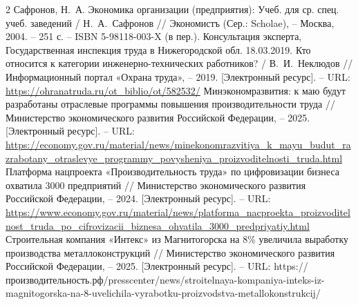 \documentclass{article}
\begin{document}
\begin{thebibliography}{2}
 Сафронов, Н.~А. Экономика организации (предприятия): Учеб. для ср. спец. учеб. заведений / Н.~А.~Сафронов // Экономистъ (Сер.: Scholae), – Москва, 2004. – 251 с. – ISBN 5-98118-003-X (в пер.).
 Консультация эксперта, Государственная инспекция труда в Нижегородской обл. 18.03.2019. Кто относится к категории инженерно-технических работников? / В.~И.~Неклюдов // Информационный портал «Охрана труда», – 2019. [Электронный ресурс]. – URL: \url{https://ohranatruda.ru/ot_biblio/ot/582532/}
 Минэкономразвития: к маю будут разработаны отраслевые программы повышения производительности труда // Министерство экономического развития Российской Федерации, – 2025. [Электронный ресурс]. – URL: \url{https://economy.gov.ru/material/news/minekonomrazvitiya_k_mayu_budut_razrabotany_otraslevye_programmy_povysheniya_proizvoditelnosti_truda.html}
 Платформа нацпроекта «Производительность труда» по цифровизации бизнеса охватила 3000 предприятий // Министерство экономического развития Российской Федерации, – 2024. [Электронный ресурс]. – URL: \url{https://www.economy.gov.ru/material/news/platforma_nacproekta_proizvoditelnost_truda_po_cifrovizacii_biznesa_ohvatila_3000_predpriyatiy.html}
 Строительная компания «Интекс» из Магнитогорска на 8\% увеличила выработку производства металлоконструкций // Министерство экономического развития Российской Федерации, – 2025. [Электронный ресурс]. – URL: https://производительность.рф/presscenter/news/stroitelnaya-kompaniya-inteks-iz-magnitogorska-na-8-uvelichila-vyrabotku-proizvodstva-metallokonstrukcij/
\end{thebibliography} 
\end{document}
